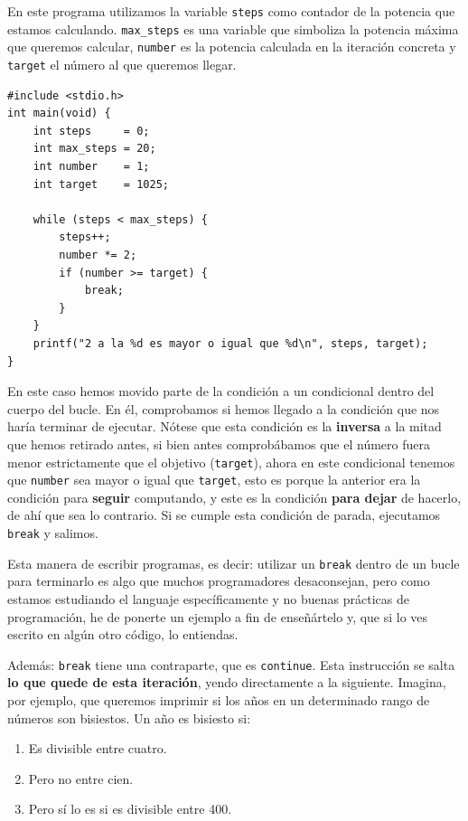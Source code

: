 \documentclass[a4paper]{article}
\begin{document}
En este programa utilizamos la variable \texttt{steps} como contador de la
potencia que estamos calculando. \texttt{max\_steps} es una variable que
simboliza la potencia máxima que queremos calcular, \texttt{number} es la
potencia calculada en la iteración concreta y \texttt{target} el número al que
queremos llegar.

\noindent
\begin{minipage}[H]{\linewidth}
\mbox{}
\begin{lstlisting}[style=C,
caption={Interrupción de un bucle con la instrucción \texttt{break}},
label={lst:breakExample}]
#include <stdio.h>
int main(void) {
    int steps     = 0;
    int max_steps = 20;
    int number    = 1;
    int target    = 1025;

    while (steps < max_steps) {
        steps++;
        number *= 2;
        if (number >= target) {
            break;
        }
    }
    printf("2 a la %d es mayor o igual que %d\n", steps, target);
}
\end{lstlisting}
\end{minipage}

En este caso hemos movido parte de la condición a un condicional dentro del
cuerpo del bucle. En él, comprobamos si hemos llegado a la condición que nos
haría terminar de ejecutar. Nótese que esta condición es la \textbf{inversa} a
la mitad que hemos retirado antes, si bien antes comprobábamos que el número
fuera menor estrictamente que el objetivo (\texttt{target}), ahora en este
condicional tenemos que \texttt{number} sea mayor o igual que \texttt{target},
esto es porque la anterior era la condición para \textbf{seguir} computando, y
este es la condición \textbf{para dejar} de hacerlo, de ahí que sea lo
contrario. Si se cumple esta condición de parada, ejecutamos \texttt{break} y
salimos.

Esta manera de escribir programas, es decir: utilizar un \texttt{break} dentro
de un bucle para terminarlo es algo que muchos programadores desaconsejan, pero
como estamos estudiando el languaje específicamente y no buenas prácticas de
programación, he de ponerte un ejemplo a fin de enseñártelo y, que si lo ves
escrito en algún otro código, lo entiendas.

Además: \verb!break! tiene una contraparte, que es \verb!continue!. Esta
instrucción se salta \textbf{lo que quede de esta iteración}, yendo directamente
a la siguiente. Imagina, por ejemplo, que queremos imprimir si los años
en un determinado rango de números son bisiestos. Un año es bisiesto si:
\begin{enumerate}
\item Es divisible entre cuatro.
\item Pero no entre cien.
\item Pero sí lo es si es divisible entre 400.
\end{enumerate}
\end{document}
